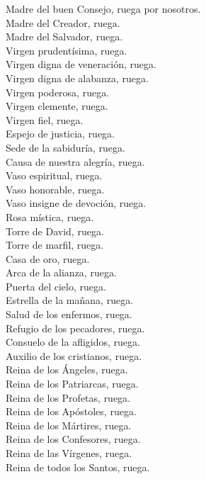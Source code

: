 \documentclass[./L00_main.tex]{subfiles}
\begin{document}
\begin{minipage}[t]{0.475\textwidth}
    Madre del buen Consejo, ruega por nosotros.\\
    Madre del Creador, ruega.\\
    Madre del Salvador, ruega.\\
    Virgen prudentísima, ruega.\\
    Virgen digna de veneración, ruega.\\
    Virgen digna de alabanza, ruega.\\
    Virgen poderosa, ruega.\\
    Virgen clemente, ruega.\\
    Virgen fiel, ruega.\\
    Espejo de justicia, ruega.\\
    Sede de la sabiduría, ruega.\\
    Causa de nuestra alegría, ruega.\\
    Vaso espiritual, ruega.\\
    Vaso honorable, ruega.\\
    Vaso insigne de devoción, ruega.\\
    Rosa mística, ruega.\\
    Torre de David, ruega.\\
    Torre de marfil, ruega.\\
    Casa de oro, ruega.\\
    Arca de la alianza, ruega.\\
    Puerta del cielo, ruega.\\
    Estrella de la mañana, ruega.\\
    Salud de los enfermos, ruega.\\
    Refugio de los pecadores, ruega.\\
    Consuelo de la afligidos, ruega.\\
    Auxilio de los cristianos, ruega.\\
    Reina de los Ángeles, ruega.\\
    Reina de los Patriarcas, ruega.\\
    Reina de los Profetas, ruega.\\
    Reina de los Apóstoles, ruega.\\
    Reina de los Mártires, ruega.\\
    Reina de los Confesores, ruega.\\
    Reina de las Vírgenes, ruega.\\
    Reina de todos los Santos, ruega.\\

\end{minipage}
\end{document}
